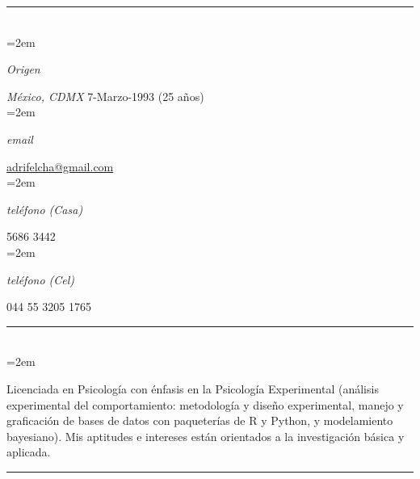 \documentclass{scrartcl}
\newlength{\datebox}\settowidth{\datebox}{Enero 2019} %
\newcommand{\NewEntry}[3]{\noindent\hangindent=2em\hangafter=0 \parbox{\datebox}{\small \textit{#1}}\hspace{1.5em} #2 #3 %
\vspace{0.5em}} %
\newcommand{\Description}[1]{\hangindent=2em\hangafter=0\noindent\raggedright\footnotesize{#1}\par\normalsize\vspace{1em}} %
\begin{document}
\thispagestyle{empty} %


\begin{cv}{\textbf{}}\vspace{1.5em} %

\hrule{}\vspace{1.5em}

\noindent{}\vspace{0.1em}\\ %

\NewEntry{Origen}{\textit{México, CDMX}}{7-Marzo-1993 (25 años)}\\ %
\NewEntry{email}{\href{mailto:adrifelcha@gmail.com}{adrifelcha@gmail.com}}\\ %
\NewEntry{teléfono (Casa)}{5686 3442}\\ %
\NewEntry{teléfono (Cel)}{044 55 3205 1765}\\%

\hrule{}\vspace{1.5em}

\noindent{}\vspace{0.1em}\\ %

\Description{Licenciada en Psicología con énfasis en la Psicología Experimental (análisis experimental del comportamiento: metodología y diseño experimental, manejo y graficación de bases de datos con paqueterías de R y Python, y modelamiento bayesiano). Mis aptitudes e intereses están orientados a la investigación básica y aplicada.}\vspace{1em} %

\hrule{}\vspace{1.5em}


\end{cv}
\end{document}
